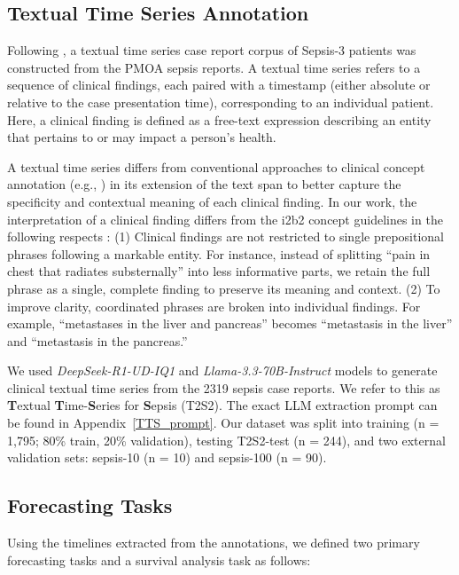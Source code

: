 \subsection{Textual Time Series Annotation}
\label{sec:tts-annotation}

Following \citeauthor{noroozizadeh2025reconstructing} \citeyearpar{noroozizadeh2025reconstructing}, a textual time series case report corpus of Sepsis-3 patients was constructed from the PMOA sepsis reports. A textual time series refers to a sequence of clinical findings, each paired with a timestamp (either absolute or relative to the case presentation time), corresponding to an individual patient. Here, a clinical finding is defined as a free-text expression describing an entity that pertains to or may impact a person's health.

A textual time series differs from conventional approaches to clinical concept annotation (e.g., \cite{sun2013evaluating,uzuner20112010}) in its extension of the text span to better capture the specificity and contextual meaning of each clinical finding. In our work, the interpretation of a clinical finding differs from the i2b2 concept guidelines in the following respects : (1) Clinical findings are not restricted to single prepositional phrases following a markable entity. For instance, instead of splitting “pain in chest that radiates substernally” into less informative parts, we retain the full phrase as a single, complete finding to preserve its meaning and context. (2) To improve clarity, coordinated phrases are broken into individual findings. For example, “metastases in the liver and pancreas” becomes “metastasis in the liver” and “metastasis in the pancreas.”

We used \textit{DeepSeek-R1-UD-IQ1} and \textit{Llama-3.3-70B-Instruct} models to generate clinical textual time series from the 2319 sepsis case reports. We refer to this as \textbf{T}extual \textbf{T}ime-\textbf{S}eries for \textbf{S}epsis (T2S2). The exact LLM extraction prompt can be found in Appendix~\ref{TTS_prompt}. Our dataset was split into training (n = 1,795; 80\% train, 20\% validation), testing T2S2-test (n = 244), and two external validation sets: sepsis-10 (n = 10) and sepsis-100 (n = 90).


\subsection{Forecasting Tasks}
Using the timelines extracted from the annotations, we defined two primary forecasting tasks and a survival analysis task as follows:

